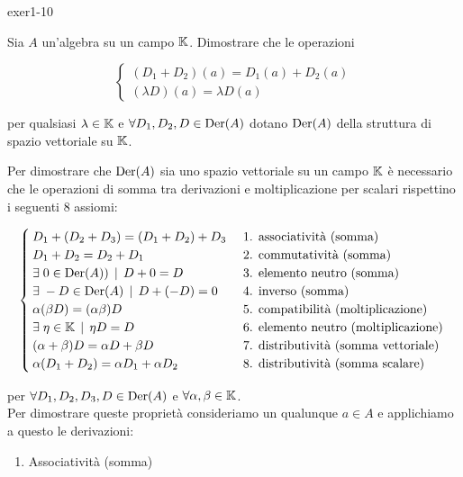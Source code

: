 {exer1-10}
{
Sia $ A $ un'algebra su un campo $ \mathbb{K} $. Dimostrare che le operazioni

\begin{equation}
	\begin{cases}
		(D_{1}+D_{2})(a) = D_{1}(a) + D_{2}(a) \\
		(\lambda D)(a) = \lambda D(a)
	\end{cases}
\end{equation}

per qualsiasi $ \lambda \in \mathbb{K} $ e $ \forall D_{1},D_{2},D \in \operatorname{Der}(A) $ dotano $ \operatorname{Der}(A) $ della struttura di spazio vettoriale su $ \mathbb{K} $.
}
{
Per dimostrare che $ \operatorname{Der}(A) $ sia uno spazio vettoriale su un campo $ \mathbb{K} $ è necessario che le operazioni di somma tra derivazioni e moltiplicazione per scalari rispettino i seguenti 8 assiomi:

\begin{equation}
	\begin{cases}
		D_{1} + (D_{2} + D_{3}) = (D_{1} + D_{2}) + D_{3} & \text{ 1. associatività (somma) } \\
		D_{1} + D_{2} = D_{2} + D_{1} & \text{ 2. commutatività (somma) } \\
		\exists \; 0 \in \operatorname{Der}(A)) \, \mid \, D + 0 = D & \text{ 3. elemento neutro (somma) } \\
		\exists \; - D \in \operatorname{Der}(A) \, \mid \, D + (- D) = 0 & \text{ 4. inverso (somma) } \\
		\alpha (\beta D) = (\alpha \beta) D & \text{ 5. compatibilità (moltiplicazione) } \\
		\exists \; \eta \in \mathbb{K} \, \mid \, \eta D = D & \text{ 6. elemento neutro (moltiplicazione) } \\
		(\alpha + \beta) D = \alpha D + \beta D & \text{ 7. distributività (somma vettoriale) } \\
		\alpha (D_{1} + D_{2}) = \alpha D_{1} + \alpha D_{2} & \text{ 8. distributività (somma scalare) }
	\end{cases}
\end{equation}

per $ \forall D_{1}, D_{2}, D_{3}, D \in \operatorname{Der}(A) $ e $ \forall \alpha, \beta \in \mathbb{K} $. \\
Per dimostrare queste proprietà consideriamo un qualunque $ a \in A $ e applichiamo a questo le derivazioni:

\begin{enumerate}
	\item Associatività (somma)
	

\end{enumerate}}
